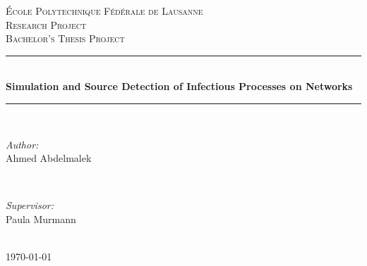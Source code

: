 \begin{titlepage}

\newcommand{\HRule}{\rule{\linewidth}{0.5mm}} %

\center %

\textsc{\LARGE École Polytechnique Fédérale de Lausanne}\\[2cm] %
\textsc{\Large Research Project}\\[1cm] %
\textsc{\large Bachelor's Thesis Project}\\[1.2cm] %

\HRule \\[0.8cm]
{ \huge \bfseries Simulation and Source Detection of Infectious Processes on Networks}\\[0.4cm] %
\HRule \\[2cm]
 
\begin{minipage}{0.4\textwidth}
\begin{flushleft} \large
\emph{Author:}\\
Ahmed Abdelmalek\\
\end{flushleft}
\end{minipage}
~
\begin{minipage}{0.4\textwidth}
\begin{flushright} \large
\emph{Supervisor:} \\
Paula Murmann
\end{flushright}
\end{minipage}\\[2cm]

{\large \today}\\[2cm]


\end{titlepage}
